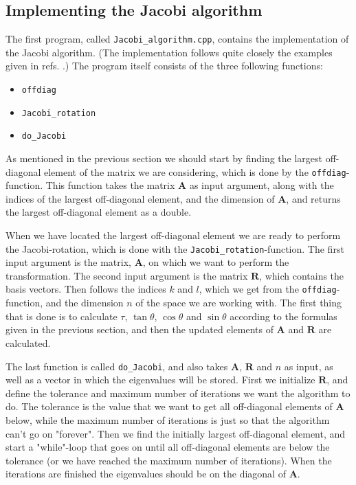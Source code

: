 \documentclass[12pt, a4paper]{article}
\begin{document}
\subsection{Implementing the Jacobi algorithm}

The first program, called \texttt{Jacobi\_algorithm.cpp}, contains the implementation of the 
Jacobi algorithm. (The implementation follows quite closely the examples given in refs.  
\cite{Lecture Notes, Lectures Eigenvalue Problems}.) The program itself consists of the three following
 functions: 
\begin{itemize}
\item \texttt{offdiag}
\item \texttt{Jacobi\_rotation}
\item \texttt{do\_Jacobi}
\end{itemize}

As mentioned in the previous section we should start by finding the largest off-diagonal element of 
the matrix we are considering, which is done by the \texttt{offdiag}-function. This function takes the 
matrix $\mathbf{A}$ as input argument, along with the indices of the largest off-diagonal element, and 
the dimension of $\mathbf{A}$, and returns the largest off-diagonal element as a double. 

When we have located the largest off-diagonal element we are ready to perform the Jacobi-rotation, 
which is done with the \texttt{Jacobi\_rotation}-function. The first input argument is the matrix, 
$\mathbf{A}$, on which we want to perform the transformation. The second input argument is the matrix
$\mathbf{R}$, which contains the basis vectors. Then follows the indices $k$ and $l$, which we get from 
the \texttt{offdiag}-function, and the dimension $n$ of the space we are working with.    
The first thing that is done is to calculate $\tau$, $\tan\theta$, $\cos\theta$ and $\sin\theta$ 
according to the formulas given in the previous section, and then the updated elements of $\mathbf{A}$ and 
$\mathbf{R}$ are calculated.

The last function is called \texttt{do\_Jacobi}, and also takes $\mathbf{A}$, $\mathbf{R}$ and $n$ as 
input, as well as a vector in which the eigenvalues will be stored. First we initialize $\mathbf{R}$, 
and define the tolerance and maximum number of iterations we want the algorithm to do. The tolerance is 
the value that we want to get all off-diagonal elements of $\mathbf{A}$ below, while the maximum number of 
iterations is just so that the algorithm can't go on "forever". Then we find the initially largest 
off-diagonal element, and start a "while"-loop that goes on until all off-diagonal elements are below 
the tolerance (or we have reached the maximum number of iterations). When the iterations are finished 
the eigenvalues should be on the diagonal of $\mathbf{A}$. 
\end{document}
